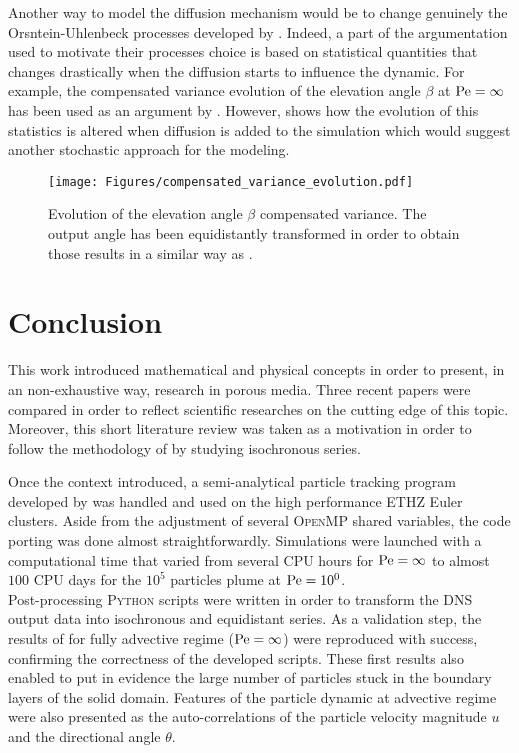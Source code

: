 Another way to model the diffusion mechanism would be to change genuinely the Orsntein-Uhlenbeck processes developed by \citet{Meyer2016}. 
Indeed, a part of the argumentation used to motivate their processes choice is based on statistical quantities that changes drastically when the diffusion starts to influence the dynamic.
For example, the compensated variance evolution of the elevation angle $\beta$ at $\mathrm{Pe} = \infty$ has been used as an argument by \citeauthor{Meyer2016}.
However,  shows how the evolution of this statistics is altered when diffusion is added to the simulation which would suggest another stochastic approach for the modeling.
\begin{figure}
	\centering
	\texttt{[image: Figures/compensated\_variance\_evolution.pdf]}
	\caption{Evolution of the elevation angle $\beta$ compensated variance. The output angle has been equidistantly transformed in order to obtain those results in a similar way as \citet{Meyer2016}.}
	\label{fig:compensated_variance_evolution}
\end{figure}

\chapter{Conclusion}
This work introduced mathematical and physical concepts in order to present, in an non-exhaustive way, research in porous media.
Three recent papers were compared in order to reflect scientific researches on the cutting edge of this topic.
Moreover, this short literature review was taken as a motivation in order to follow the methodology of \citet{Meyer2016} by studying isochronous series.

Once the context introduced, a semi-analytical particle tracking program developed by \citet{Meyer2017} was handled and used on the high performance ETHZ Euler clusters.
Aside from the adjustment of several \textsc{OpenMP} shared variables, the code porting was done almost straightforwardly.
Simulations were launched with a computational time that varied from several CPU hours for $\mathrm{Pe}=\infty$ to almost $100$ CPU days for the $10^5$ particles plume at $\mathrm{Pe}=10^0$.\\
Post-processing \textsc{Python} scripts were written in order to transform the DNS output data into isochronous and equidistant series. 
As a validation step, the results of \citet{Meyer2016} for fully advective regime ($\mathrm{Pe}=\infty$) were reproduced with success, confirming the correctness of the developed scripts.
These first results also enabled to put in evidence the large number of particles stuck in the boundary layers of the solid domain.
Features of the particle dynamic at advective regime were also presented as the auto-correlations of the particle velocity magnitude $u$ and the directional angle $\theta$.

